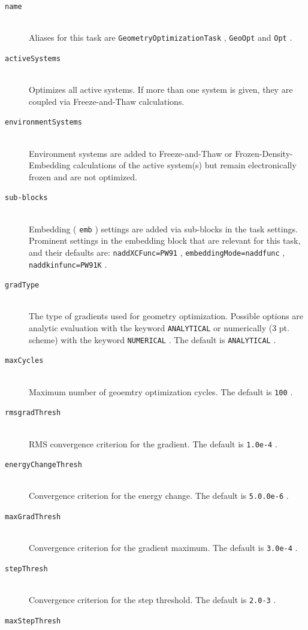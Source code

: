 \documentclass[bibliography=totocnumbered,a4paper,10pt,oneside]{scrbook}
\newcommand{\ttt}[1]{%
  \begingroup\setlength{\fboxsep}{1pt}%
  \colorbox{serenity-green!30}{\texttt{\hspace*{2pt}\vphantom{(g}#1\hspace*{2pt}}}%
  \endgroup
}
\begin{document}
\begin{description}
 \item [\texttt{name}]\hfill \\
   Aliases for this task are \ttt{GeometryOptimizationTask} , \ttt{GeoOpt} and \ttt{Opt}.
 \item [\texttt{activeSystems}]\hfill \\
   Optimizes all active systems. If more than one system is given, they are coupled via Freeze-and-Thaw calculations.
 \item [\texttt{environmentSystems}]\hfill \\
  Environment systems are added to Freeze-and-Thaw or Frozen-Density-Embedding calculations of the active system(s) but remain electronically frozen and are not optimized.
 \item [\texttt{sub-blocks}]\hfill \\
   Embedding (\ttt{emb}) settings are added via sub-blocks in the task settings.
   Prominent settings in the embedding block that are relevant for this task, and their defaults are:
   \ttt{naddXCFunc=PW91}, \ttt{embeddingMode=naddfunc}, \ttt{naddkinfunc=PW91K}.
 \item [\texttt{gradType}]\hfill \\
   The type of gradients used for geometry optimization. Possible options are analytic evaluation with the keyword \ttt{ANALYTICAL} or numerically (3 pt. scheme) with the keyword \ttt{NUMERICAL}. The default is \ttt{ANALYTICAL}.
 \item [\texttt{maxCycles}]\hfill \\
   Maximum number of  geoemtry optimization cycles. The default is \ttt{100}.
 \item [\texttt{rmsgradThresh}]\hfill \\
   RMS convergence criterion for the gradient. The default is \ttt{1.0e-4}. 
 \item [\texttt{energyChangeThresh}]\hfill \\
   Convergence criterion for the energy change. The default is \ttt{5.0.0e-6}. 
 \item [\texttt{maxGradThresh}]\hfill \\ 
  Convergence criterion for the gradient maximum. The default is \ttt{3.0e-4}. 
 \item [\texttt{stepThresh}]\hfill \\
  Convergence criterion for the step threshold. The default is \ttt{2.0-3}. 
 \item [\texttt{maxStepThresh}]\hfill \\

\end{description}
\end{document}
